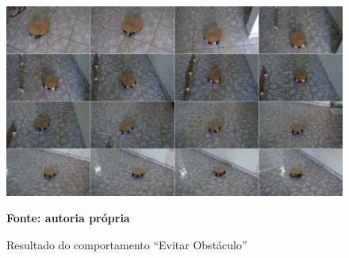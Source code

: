 \begin{figure}[!ht]
\centering
\caption{Resultado do comportamento ``Evitar Obstáculo''}
\label{fig:resultadoImplementadoEO}
		\centering
		\includegraphics[clip, 
scale=0.29]{Figuras/ComportamentoEOCompactado}%

	\textbf{Fonte: autoria própria}
\end{figure}